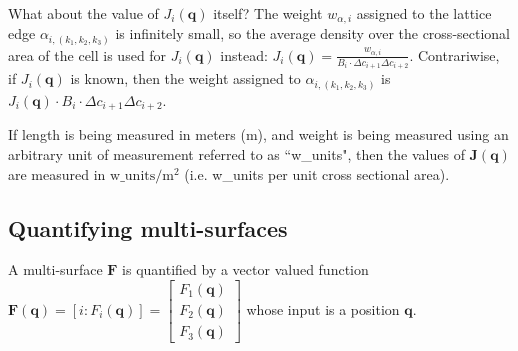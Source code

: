 What about the value of \(J_i(\mathbf{q})\) itself? The weight \(w_{\alpha,i}\) assigned to the lattice edge \(\alpha_{i, (k_1,k_2,k_3)}\) is infinitely small, so the average density over the cross-sectional area of the cell is used for \(J_i(\mathbf{q})\) instead: \(J_i(\mathbf{q}) = \frac{w_{\alpha,i}}{B_i \cdot \Delta c_{i+1} \Delta c_{i+2}}\). Contrariwise, if \(J_i(\mathbf{q})\) is known, then the weight assigned to \(\alpha_{i, (k_1,k_2,k_3)}\) is \(J_i(\mathbf{q}) \cdot B_i \cdot \Delta c_{i+1} \Delta c_{i+2}\).

If length is being measured in meters (m), and weight is being measured using an arbitrary unit of measurement referred to as ``w\_units", then the values of \(\mathbf{J}(\mathbf{q})\) are measured in \(\text{w\_units}/\text{m}^2\) (i.e. w\_units per unit cross sectional area).

%
%




\subsection{Quantifying multi-surfaces}

A multi-surface \(\mathbf{F}\) is quantified by a vector valued function \(\mathbf{F}(\mathbf{q}) = [i : F_i(\mathbf{q})] = \begin{bmatrix} F_1(\mathbf{q}) \\ F_2(\mathbf{q}) \\ F_3(\mathbf{q}) \end{bmatrix}\) whose input is a position \(\mathbf{q}\). 

\vspace{5mm}

